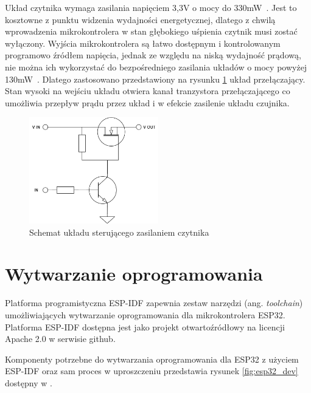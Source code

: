
            Układ czytnika wymaga zasilania napięciem 3,3V o mocy do 330mW~\cite{mfrc522-ds}. Jest to kosztowne z punktu widzenia wydajności energetycznej, dlatego z chwilą wprowadzenia mikrokontrolera w stan głębokiego uśpienia czytnik musi zostać wyłączony. Wyjścia mikrokontrolera są łatwo dostępnym i kontrolowanym programowo źródłem napięcia, jednak ze względu na niską wydajność prądową, nie można ich wykorzystać do bezpośredniego zasilania układów o mocy powyżej 130mW~\cite{esp32-ds}. Dlatego zastosowano przedstawiony na rysunku \ref{fig:rfid_power_relay} układ przełączający. Stan wysoki na wejściu układu otwiera kanał tranzystora przełączającego co umożliwia przepływ prądu przez układ i w efekcie zasilenie układu czujnika.

            \begin{figure}[]
                \centering
                \includegraphics[width=0.5\textwidth]{chapters/images/rfid_power_relay.png}
                \caption{Schemat układu sterującego zasilaniem czytnika}
                \label{fig:rfid_power_relay}
            \end{figure}

    \section{Wytwarzanie oprogramowania}

        Platforma programistyczna ESP-IDF zapewnia zestaw narzędzi (ang. \textit{toolchain}) umożliwiających wytwarzanie oprogramowania dla mikrokontrolera ESP32. Platforma ESP-IDF dostępna jest jako projekt otwartoźródłowy na licencji Apache 2.0 w serwisie github.

        Komponenty potrzebne do wytwarzania oprogramowania dla ESP32 z użyciem ESP-IDF oraz sam proces w uproszczeniu przedstawia rysunek \ref{fig:esp32_dev} dostępny w \cite{esp-idf-get-started}.

